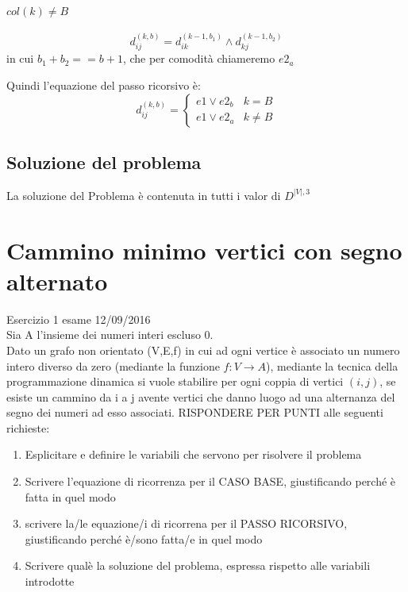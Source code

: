 \documentclass[12pt, a4paper, openany]{book}
\begin{document}
\paragraph{$col(k) \neq B$}
\begin{equation*}
	d_{ij}^{(k,b)} = d_{ik}^{(k-1,b_1)} \land d_{kj}^{(k-1,b_2)}
\end{equation*}
in cui $b_1 + b_2 == b+1$, che per comodità chiameremo $e2_a$

Quindi l'equazione del passo ricorsivo è:
\begin{equation*}
	d^{(k,b)}_{ij} = \begin{cases}
		e1 \lor e2_b & k=B     \\
		e1 \lor e2_a & k\neq B
	\end{cases}
\end{equation*}

\subsection*{Soluzione del problema}
La soluzione del Problema è contenuta in tutti i valor di $D^{|V|,3}$

\section{Cammino minimo vertici con segno alternato} Esercizio 1 esame 12/09/2016\\
Sia A l'insieme dei numeri interi escluso 0.\\
Dato un grafo non orientato (V,E,f) in cui ad ogni vertice è associato un numero intero
diverso da zero (mediante la funzione $f: V\rightarrow A$), mediante la tecnica della
programmazione dinamica si vuole stabilire per ogni coppia di vertici $(i,j)$, se esiste un
cammino da i a j avente vertici che danno luogo ad una alternanza del segno dei numeri
ad esso associati. RISPONDERE PER PUNTI alle seguenti richieste:
\begin{enumerate}
	\item Esplicitare e definire le variabili che servono per risolvere il problema
	\item Scrivere l'equazione di ricorrenza per il CASO BASE, giustificando perché è fatta in quel modo
	\item scrivere la/le equazione/i di ricorrena per il PASSO RICORSIVO, giustificando perché è/sono fatta/e in quel modo
	\item Scrivere qualè la soluzione del problema, espressa rispetto alle variabili introdotte
\end{enumerate}
\end{document}
